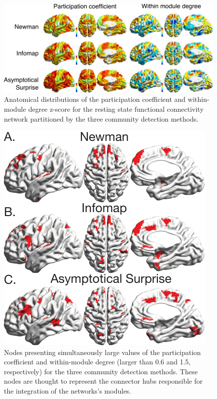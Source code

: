 \begin{figure}[htb!]
\includegraphics[width=\textwidth]{images/pacopaperfigure8.pdf}
\caption{Anatomical distributions of the participation coefficient and within-module degree z-score for the resting state functional connectivity network partitioned by the three community detection methods.}
\label{fig:hubclassification}
\end{figure}


\begin{figure}[htb!]
\includegraphics[width=\textwidth]{images/pacopaperfigure9.pdf}
\caption{Nodes presenting simultaneously large values of the participation coefficient and within-module degree (larger than 0.6 and 1.5, respectively) for the three community detection methods. These nodes are thought to represent the connector hubs responsible for the integration of the networks's modules.
}
\label{fig:hubclassification_threshold}
\end{figure}

